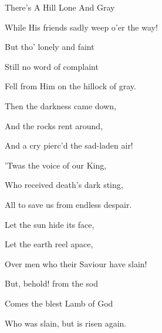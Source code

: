 \documentclass[12pt]{book}
\begin{document}
\begin{song}{There's A Hill Lone And Gray}{}
\begin{SBVerse}
    While His friends sadly weep o'er the way!

    But tho' lonely and faint

    Still no word of complaint

    Fell from Him on the hillock of gray.
  \end{SBVerse}

  \begin{SBVerse}
    Then the darkness came down,

    And the rocks rent around,

    And a cry pierc'd the sad-laden air!

    'Twas the voice of our King,

    Who received death's dark sting,

    All to save us from endless despair.
  \end{SBVerse}

  \begin{SBVerse}
    Let the sun hide its face,

    Let the earth reel apace,

    Over men who their Saviour have slain!

    But, behold! from the sod

    Comes the blest Lamb of God

    Who was slain, but is risen again.
  \end{SBVerse}

\end{song}
\end{document}
